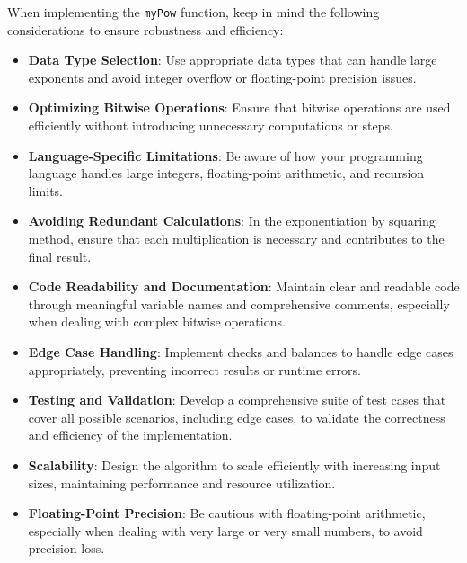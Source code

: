 When implementing the \texttt{myPow} function, keep in mind the following considerations to ensure robustness and efficiency:

\begin{itemize}
    \item \textbf{Data Type Selection}: Use appropriate data types that can handle large exponents and avoid integer overflow or floating-point precision issues.
    
    \item \textbf{Optimizing Bitwise Operations}: Ensure that bitwise operations are used efficiently without introducing unnecessary computations or steps.
    
    \item \textbf{Language-Specific Limitations}: Be aware of how your programming language handles large integers, floating-point arithmetic, and recursion limits.
    
    \item \textbf{Avoiding Redundant Calculations}: In the exponentiation by squaring method, ensure that each multiplication is necessary and contributes to the final result.
    
    \item \textbf{Code Readability and Documentation}: Maintain clear and readable code through meaningful variable names and comprehensive comments, especially when dealing with complex bitwise operations.
    
    \item \textbf{Edge Case Handling}: Implement checks and balances to handle edge cases appropriately, preventing incorrect results or runtime errors.
    
    \item \textbf{Testing and Validation}: Develop a comprehensive suite of test cases that cover all possible scenarios, including edge cases, to validate the correctness and efficiency of the implementation.
    
    \item \textbf{Scalability}: Design the algorithm to scale efficiently with increasing input sizes, maintaining performance and resource utilization.
    
    \item \textbf{Floating-Point Precision}: Be cautious with floating-point arithmetic, especially when dealing with very large or very small numbers, to avoid precision loss.
    

\end{itemize}
